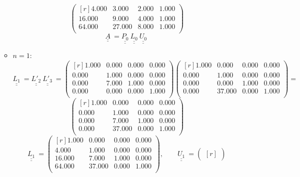 \documentclass{report}[10pts]
\begin{document}
\begin{enumerate}[- Ex. 1]
\begin{itemize}
\[\begin{pmatrix*}[r]
         4.000 & 3.000 & 2.000 & 1.000\\
         16.000 & 9.000 & 4.000 & 1.000\\
         64.000 & 27.000 & 8.000 & 1.000\\
      \end{pmatrix*}
\]
\[
   \underline{\underline{A}}~
   =
   \underline{\underline{P_{0}}}~
   \underline{\underline{L_{0}}}~
   \underline{\underline{U_{0}}}~
\]
\item $n=1$:
\[
   \underline{\underline{L_{1}}}~
   =
   \underline{\underline{L'_{2}}}~
   \underline{\underline{L'_{3}}}~
   =
      \begin{pmatrix}[r]
         1.000 & 0.000 & 0.000 & 0.000\\
         0.000 & 1.000 & 0.000 & 0.000\\
         0.000 & 7.000 & 1.000 & 0.000\\
         0.000 & 0.000 & 0.000 & 1.000\\
      \end{pmatrix}
      \begin{pmatrix}[r]
         1.000 & 0.000 & 0.000 & 0.000\\
         0.000 & 1.000 & 0.000 & 0.000\\
         0.000 & 0.000 & 1.000 & 0.000\\
         0.000 & 37.000 & 0.000 & 1.000\\
      \end{pmatrix}
   =
\]
\[
      \begin{pmatrix*}[r]
         1.000 & 0.000 & 0.000 & 0.000\\
         0.000 & 1.000 & 0.000 & 0.000\\
         0.000 & 7.000 & 1.000 & 0.000\\
         0.000 & 37.000 & 0.000 & 1.000\\
      \end{pmatrix*}
\]
\[
   \underline{\underline{L_{1}}}~
   =
      \begin{pmatrix*}[r]
         1.000 & 0.000 & 0.000 & 0.000\\
         4.000 & 1.000 & 0.000 & 0.000\\
         16.000 & 7.000 & 1.000 & 0.000\\
         64.000 & 37.000 & 0.000 & 1.000\\
      \end{pmatrix*}
   ,\qquad
   \underline{\underline{U_{1}}}~
   =
      \begin{pmatrix*}[r]

\end{pmatrix*}\]
\end{itemize}
\end{enumerate}
\end{document}
